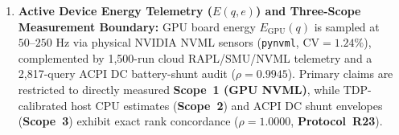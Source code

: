 \documentclass[10pt,a4paper]{article}
\begin{document}
\begin{enumerate}[leftmargin=1.5em,itemsep=3pt]
    \begin{equation}
        \mathcal{M}_{\text{slot}}(q) = \frac{T_{\text{BQ\_Slot}}(q)}{T_{\text{BQ\_Wall}}(q)}, \qquad \Delta C_{\text{1M}}(q) = 10^6 \times \left( \frac{\max(\mathcal{B}_{\text{unopt}}(q), 10) - \max(\mathcal{B}_{\text{clustered}}(q), 10)}{1024^2\text{ [MiB/TiB]}} \right) \times \alpha_{\text{TB}}
    \end{equation}
    \item \textbf{Active Device Energy Telemetry ($E(q,e)$) and Three-Scope Measurement Boundary:} GPU board energy $E_{\text{GPU}}(q)$ is sampled at $50\text{--}250\text{ Hz}$ via physical NVIDIA NVML sensors (\texttt{pynvml}, $\text{CV}=1.24\%$), complemented by 1,500-run cloud RAPL/SMU/NVML telemetry and a 2,817-query ACPI DC battery-shunt audit ($\rho=0.9945$). Primary claims are restricted to directly measured \textbf{Scope~1 (GPU NVML)}, while TDP-calibrated host CPU estimates (\textbf{Scope~2}) and ACPI DC shunt envelopes (\textbf{Scope~3}) exhibit exact rank concordance ($\rho=1.0000$, \textbf{Protocol~R23}).
\end{enumerate}
\end{document}
